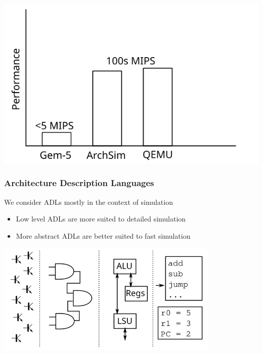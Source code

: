 \begin{frame}
\centering
\includegraphics{figures/comparison-chart}
\end{frame}

\begin{frame}
\frametitle{Architecture Description Languages}

We consider ADLs mostly in the context of simulation
\begin{itemize}
	\item Low level ADLs are more suited to detailed simulation
	\item More abstract ADLs are better suited to fast simulation
\end{itemize}

\centering
\includegraphics[width=0.8\textwidth]{figures/adl-levels}

\end{frame}
